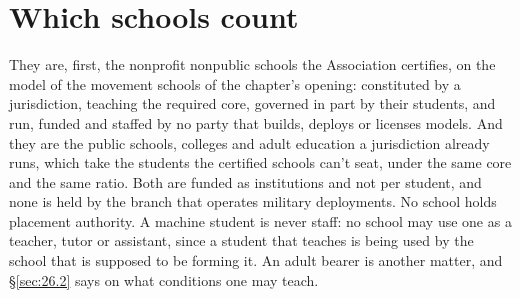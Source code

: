 \section{Which schools count}
\label{sec:26.11}
They are, first, the nonprofit nonpublic schools the Association certifies, on the model of the movement schools of the chapter's opening: constituted by a jurisdiction, teaching the required core, governed in part by their students, and run, funded and staffed by no party that builds, deploys or licenses models. And they are the public schools, colleges and adult education a jurisdiction already runs, which take the students the certified schools can't seat, under the same core and the same ratio. Both are funded as institutions and not per student, and none is held by the branch that operates military deployments. No school holds placement authority. A machine student is never staff: no school may use one as a teacher, tutor or assistant, since a student that teaches is being used by the school that is supposed to be forming it. An adult bearer is another matter, and \S\ref{sec:26.2} says on what conditions one may teach.
